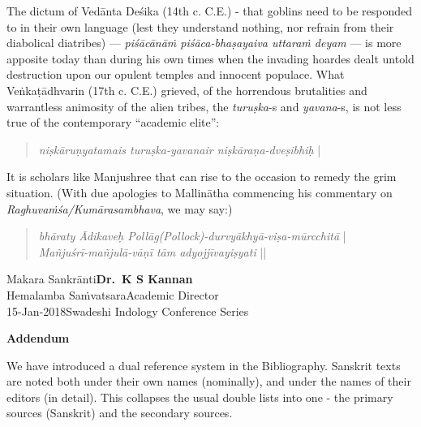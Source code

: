 The dictum of Vedānta Deśika (14th c. C.E.) - that goblins need to be responded to in their own language (lest they understand nothing, nor refrain from their diabolical diatribes) --- {\sl piśācānāṁ piśāca-bhaṣayaiva uttaraṁ deyam} --- is more apposite today than during his own times when the invading hoardes dealt untold destruction upon our opulent temples and innocent populace. What Veṅkaṭādhvarin (17th c. C.E.) grieved, of the horrendous brutalities and warrantless animosity of the alien tribes, the {\sl turuṣka}-s and {\sl yavana}-s, is not less true of the contemporary ``academic elite'':
\begin{quote}
{{\sl niṣkāruṇyatamais turuṣka-yavanair niṣkāraṇa-dveṣibhiḥ}} |
\end{quote}
It is scholars like Manjushree that can rise to the occasion to remedy the grim situation. (With due apologies to Mallinātha commencing his commentary on {\sl Raghuvaṁśa/Kumārasambhava}, we may say:)
\begin{quote}
{{\sl bhāraty Ādikaveḥ Pollāg(Pollock)-durvyākhyā-viṣa-mūrcchitā}} |\\
{\sl Mañjuśrī-mañjulā-vāṇī tām adyojjīvayiṣyati} ||
\end{quote}

\noindent
Makara Sankrānti\hfill	{\bf Dr.~K S Kannan}\\
Hemalamba Saṁvatsara\hfill Academic Director\\
15-Jan-2018\hfill Swadeshi Indology Conference Series
\vskip 10pt

\centerline{\bf  Addendum}

{\small We have introduced a dual reference system in the Bibliography. Sanskrit texts are noted both under their own names (nominally), and under the names of their editors (in detail). This collapses the usual double lists into one - the primary sources (Sanskrit) and the secondary sources.}
